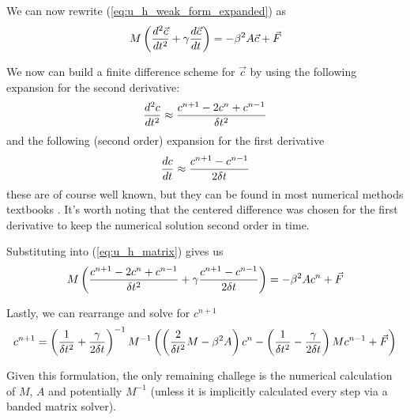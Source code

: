 We can now rewrite (\ref{eq:u_h_weak_form_expanded}) as
\begin{equation} \label{eq:u_h_matrix}
M\left( \frac{d^2 \vec{c}}{d t^2} + \gamma\frac{d \vec{c}}{d t} \right) = - \beta^2 A \vec{c} + \vec{F}
\end{equation}

We now can build a finite difference scheme for $\vec{c}$ by using the following expansion for the second derivative:
\begin{equation} \label{eq:second_derivative_finite_difference}
\frac{d^2 c}{d t^2} \approx \frac{c^{n+1} - 2c^n + c^{n-1}}{\delta t^2}
\end{equation}
and the following (second order) expansion for the first derivative
\begin{equation} \label{eq:first_derivative_finite_difference}
\frac{d c}{d t} \approx \frac{c^{n+1} - c^{n-1}}{2\delta t}
\end{equation}
these are of course well known, but they can be found in most numerical methods textbooks \cite{difference_formulas}.
It's worth noting that the centered difference was chosen for the first derivative to keep the numerical solution second
order in time.

Substituting into (\ref{eq:u_h_matrix}) gives us
\begin{equation} \label{eq:finite_diff_weak_form}
M \left( \frac{c^{n+1} - 2c^n + c^{n-1}}{\delta t^2} + \gamma \frac{c^{n+1} - c^{n-1}}{2\delta t} \right) = - \beta^2 A c^n + \vec{F}
\end{equation}

Lastly, we can rearrange and solve for $c^{n+1}$
\begin{equation} \label{eq:finite_diff_solution}
c^{n+1} = \left( \frac{1}{\delta t^2} + \frac{\gamma}{2\delta t} \right)^{-1} M^{-1}
\left(
\left( \frac{2}{\delta t^2}M - \beta^2 A \right) c^n
-
\left( \frac{1}{\delta t^2} - \frac{\gamma}{2\delta t} \right) M c^{n-1}
+
\vec{F}
\right)
\end{equation}

Given this formulation, the only remaining challege is the numerical calculation of $M$, $A$ and potentially
$M^{-1}$ (unless it is implicitly calculated every step via a banded matrix solver).
